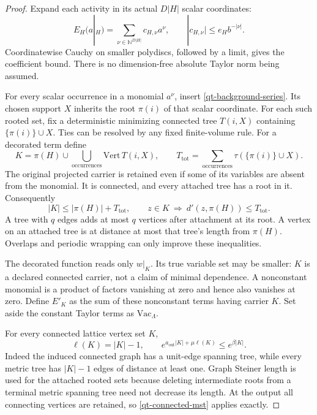 \documentclass[11pt]{article}
\theoremstyle{remark}
\begin{document}
\begin{proof}
Expand each activity in its actual $D|H|$ scalar coordinates:
\begin{equation}\label{qt-taylor}
 E_H(a|_H)=\sum_{\nu\in\mathbb N^{D|H|}}c_{H,\nu}a^\nu,
 \qquad |c_{H,\nu}|\le e_H b^{-|\nu|}.
\end{equation}
Coordinatewise Cauchy on smaller polydiscs, followed by a limit,
gives the coefficient bound. There is no dimension-free absolute
Taylor norm being assumed.

For every scalar occurrence in a monomial $a^\nu$, insert
\eqref{qt-background-series}. Its chosen support $X$ inherits the
root $\pi(i)$ of that scalar coordinate. For each such rooted set,
fix a deterministic minimizing connected tree $T(i,X)$ containing
$\{\pi(i)\}\cup X$. Ties can be resolved by any fixed finite-volume
rule. For a decorated term define
\begin{equation}\label{qt-hull}
 K=\pi(H)\cup\bigcup_{\text{occurrences}}\mathrm{Vert}\,T(i,X),
 \qquad T_{\mathrm{tot}}
       =\sum_{\text{occurrences}}\tau(\{\pi(i)\}\cup X).
\end{equation}
The original projected carrier is retained even if some of its
variables are absent from the monomial. It is connected, and every
attached tree has a root in it. Consequently
\begin{equation}\label{qt-hull-geometry}
 |K|\le|\pi(H)|+T_{\mathrm{tot}},\qquad
 z\in K\ \Longrightarrow\ d'(z,\pi(H))\le T_{\mathrm{tot}}.
\end{equation}
A tree with $q$ edges adds at most $q$ vertices after attachment at
its root. A vertex on an attached tree is at distance at most that
tree's length from $\pi(H)$. Overlaps and periodic wrapping can
only improve these inequalities.

The decorated function reads only $w|_K$. Its true variable set may
be smaller: $K$ is a declared connected carrier, not a claim of
minimal dependence. A nonconstant monomial is a product of factors
vanishing at zero and hence also vanishes at zero. Define $E'_K$ as
the sum of these nonconstant terms having carrier $K$. Set aside
the constant Taylor terms as $\mathrm{Vac}_\Lambda$.

For every connected lattice vertex set $K$,
\begin{equation}\label{qt-connected-mst}
 \ell(K)=|K|-1,
 \qquad e^{a_{\mathrm{out}}|K|+\mu\ell(K)}\le e^{\beta|K|}.
\end{equation}
Indeed the induced connected graph has a unit-edge spanning tree,
while every metric tree has $|K|-1$ edges of distance at least one.
Graph Steiner length is used for the attached rooted sets because
deleting intermediate roots from a terminal metric spanning tree
need not decrease its length. At the output all connecting vertices
are retained, so \eqref{qt-connected-mst} applies exactly.


\end{proof}
\end{document}

